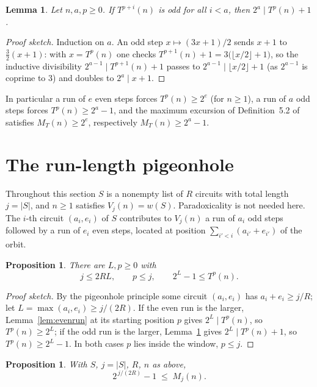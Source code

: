 \documentclass[11pt]{amsart}
\theoremstyle{plain}
\newtheorem{proposition}[theorem]{Proposition}
\newtheorem{lemma}[theorem]{Lemma}
\theoremstyle{definition}
\theoremstyle{remark}
\begin{document}
\begin{lemma}\label{lem:oddrun}
Let $n,a,p\ge 0$.  If $T^{p+i}(n)$ is odd for all $i<a$, then
$2^{a}\mid T^{p}(n)+1$.
\end{lemma}

\begin{proof}[Proof sketch]
Induction on $a$.  An odd step $x\mapsto(3x+1)/2$ sends $x+1$ to
$\tfrac{3}{2}(x+1)$: with $x=T^{p}(n)$ one checks
$T^{p+1}(n)+1=3\bigl(\lfloor x/2\rfloor+1\bigr)$, so the inductive
divisibility $2^{a-1}\mid T^{p+1}(n)+1$ passes to $2^{a-1}\mid
\lfloor x/2\rfloor+1$ (as $2^{a-1}$ is coprime to $3$) and doubles to
$2^{a}\mid x+1$.
\end{proof}

In particular a run of $e$ even steps forces $T^{p}(n)\ge 2^{e}$ (for
$n\ge1$), a run of $a$ odd steps forces $T^{p}(n)\ge 2^{a}-1$, and the
maximum excursion of Definition~5.2 of \cite{Roz25} satisfies
$M_T(n)\ge 2^{e}$, respectively $M_T(n)\ge 2^{a}-1$.

\section{The run-length pigeonhole}\label{sec:pigeonhole}

Throughout this section $S$ is a nonempty list of $R$ circuits with total
length $j=|S|$, and $n\ge 1$ satisfies $V_j(n)=w(S)$.  Paradoxicality is not
needed here.  The $i$-th circuit $(a_i,e_i)$ of $S$ contributes to $V_j(n)$
a run of $a_i$ odd steps followed by a run of $e_i$ even steps, located at
position $\sum_{i'<i}(a_{i'}+e_{i'})$ of the orbit.

\begin{proposition}\label{prop:shapeexc}
There are $L,p\ge 0$ with
\[
j\le 2RL,
\qquad
p\le j,
\qquad
2^{L}-1\le T^{p}(n).
\]
\end{proposition}

\begin{proof}[Proof sketch]
By the pigeonhole principle some circuit $(a_i,e_i)$ has
$a_i+e_i\ge j/R$; let $L=\max(a_i,e_i)\ge j/(2R)$.  If the even run is the
larger, Lemma~\ref{lem:evenrun} at its starting position $p$ gives
$2^{L}\mid T^{p}(n)$, so $T^{p}(n)\ge 2^{L}$; if the odd run is the larger,
Lemma~\ref{lem:oddrun} gives $2^{L}\mid T^{p}(n)+1$, so
$T^{p}(n)\ge 2^{L}-1$.  In both cases $p$ lies inside the window,
$p\le j$.
\end{proof}

\begin{proposition}\label{prop:pigeonhole}
With $S$, $j=|S|$, $R$, $n$ as above,
\[
2^{\,j/(2R)}-1 \;\le\; M_j(n).
\]
\end{proposition}
\end{document}
